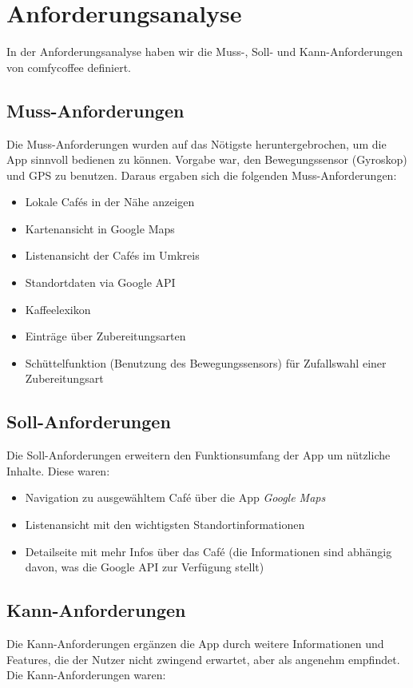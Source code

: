 \section{Anforderungsanalyse}
In der Anforderungsanalyse haben wir die Muss-, Soll- und Kann-Anforderungen von comfycoffee definiert.

\subsection{Muss-Anforderungen}
\label{subsec:mussanforderungen}
Die Muss-Anforderungen wurden auf das Nötigste heruntergebrochen, um die App sinnvoll bedienen zu können. Vorgabe war, den Bewegungssensor (Gyroskop) und GPS zu benutzen. Daraus ergaben sich die folgenden Muss-Anforderungen:

\begin{itemize}
	\item Lokale Cafés in der Nähe anzeigen
	\item Kartenansicht in Google Maps
	\item Listenansicht der Cafés im Umkreis
	\item Standortdaten via Google API
	\item Kaffeelexikon
	\item Einträge über Zubereitungsarten
	\item Schüttelfunktion (Benutzung des Bewegungssensors) für Zufallswahl einer Zubereitungsart
\end{itemize}

\subsection{Soll-Anforderungen}
Die Soll-Anforderungen erweitern den Funktionsumfang der App um nützliche Inhalte. Diese waren:

\begin{itemize}
	\item Navigation zu ausgewähltem Café über die App \emph{Google Maps}
	\item Listenansicht mit den wichtigsten Standortinformationen
	\item Detailseite mit mehr Infos über das Café (die Informationen sind abhängig davon, was die Google API zur Verfügung stellt)
\end{itemize}

\subsection{Kann-Anforderungen}
Die Kann-Anforderungen ergänzen die App durch weitere Informationen und Features, die der Nutzer nicht zwingend erwartet, aber als angenehm empfindet. Die Kann-Anforderungen waren:

